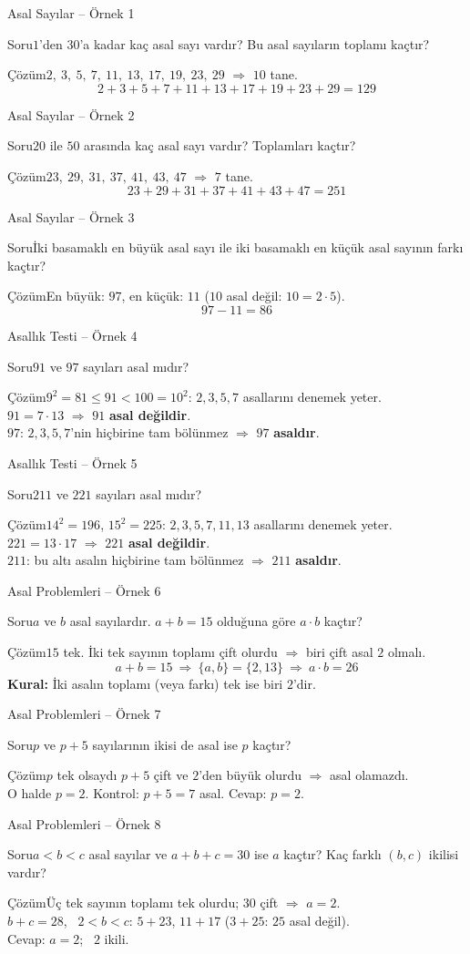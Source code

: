 \documentclass[aspectratio=169,11pt]{beamer}
\newcommand{\soru}[3]{%
\begin{frame}{#1}
  \begin{block}{Soru}\large #2\end{block}
  \pause
  \begin{exampleblock}{Çözüm}\large #3\end{exampleblock}
\end{frame}}
\begin{document}
\soru{Asal Sayılar -- Örnek 1}
{\(1\)'den \(30\)'a kadar kaç asal sayı vardır? Bu asal sayıların toplamı kaçtır?}
{\(2,\ 3,\ 5,\ 7,\ 11,\ 13,\ 17,\ 19,\ 23,\ 29\) \(\Rightarrow\) \(10\) tane.
\[2+3+5+7+11+13+17+19+23+29=129\]}

\soru{Asal Sayılar -- Örnek 2}
{\(20\) ile \(50\) arasında kaç asal sayı vardır? Toplamları kaçtır?}
{\(23,\ 29,\ 31,\ 37,\ 41,\ 43,\ 47\) \(\Rightarrow\) \(7\) tane.
\[23+29+31+37+41+43+47=251\]}

\soru{Asal Sayılar -- Örnek 3}
{İki basamaklı en büyük asal sayı ile iki basamaklı en küçük asal sayının farkı kaçtır?}
{En büyük: \(97\), \quad en küçük: \(11\) \quad (\(10\) asal değil: \(10=2\cdot 5\)).
\[97-11=86\]}

\soru{Asallık Testi -- Örnek 4}
{\(91\) ve \(97\) sayıları asal mıdır?}
{\(9^2=81\le 91<100=10^2\): \(2,3,5,7\) asallarını denemek yeter.\\[3pt]
\(91=7\cdot 13\) \(\Rightarrow\) \(91\) \textbf{asal değildir}.\\[3pt]
\(97\): \(2,3,5,7\)'nin hiçbirine tam bölünmez \(\Rightarrow\) \(97\) \textbf{asaldır}.}

\soru{Asallık Testi -- Örnek 5}
{\(211\) ve \(221\) sayıları asal mıdır?}
{\(14^2=196\), \(15^2=225\): \(2,3,5,7,11,13\) asallarını denemek yeter.\\[3pt]
\(221=13\cdot 17\) \(\Rightarrow\) \(221\) \textbf{asal değildir}.\\[3pt]
\(211\): bu altı asalın hiçbirine tam bölünmez \(\Rightarrow\) \(211\) \textbf{asaldır}.}

\soru{Asal Problemleri -- Örnek 6}
{\(a\) ve \(b\) asal sayılardır. \(a+b=15\) olduğuna göre \(a\cdot b\) kaçtır?}
{\(15\) tek. İki tek sayının toplamı çift olurdu \(\Rightarrow\) biri çift asal \(2\) olmalı.
\[a+b=15\ \Rightarrow\ \{a,b\}=\{2,13\}\ \Rightarrow\ a\cdot b=26\]
\textbf{Kural:} İki asalın toplamı (veya farkı) tek ise biri \(2\)'dir.}

\soru{Asal Problemleri -- Örnek 7}
{\(p\) ve \(p+5\) sayılarının ikisi de asal ise \(p\) kaçtır?}
{\(p\) tek olsaydı \(p+5\) çift ve \(2\)'den büyük olurdu \(\Rightarrow\) asal olamazdı.\\[3pt]
O halde \(p=2\). \quad Kontrol: \(p+5=7\) asal. \quad Cevap: \(p=2\).}

\soru{Asal Problemleri -- Örnek 8}
{\(a<b<c\) asal sayılar ve \(a+b+c=30\) ise \(a\) kaçtır? Kaç farklı \((b,c)\) ikilisi vardır?}
{Üç tek sayının toplamı tek olurdu; \(30\) çift \(\Rightarrow\) \(a=2\).\\[3pt]
\(b+c=28\), \ \(2<b<c\): \quad \(5+23\), \quad \(11+17\) \quad (\(3+25\): \(25\) asal değil).\\[3pt]
Cevap: \(a=2\); \ \(2\) ikili.}
\end{document}
